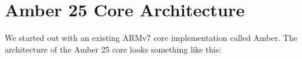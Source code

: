 \section{Amber 25 Core Architecture}
We started out with an existing ARMv7 core implementation called Amber. The architecture of the Amber 25 core looks something like this: